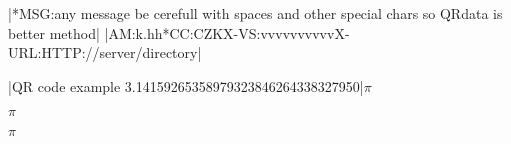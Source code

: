 {{\def\QRPamt{*AM:k.hh*CC:CZK}%
\QRdata|*MSG:any message be cerefull with spaces and other special chars so QRdata is better method|\!\def\!\QRPmsg\!{\QRcontent}%
\def\QRPvs{*X-VS:vvvvvvvvvv}%
\def\QRPurl{*X-URL:HTTP://server/directory}%
\def\QRPay{\edef\QRPcontent{|\QRPstart\QRPacc\QRPamt\QRPdspl\QRPmsg\QRPvs\QRPss\QRPurl|}%
\!\QRdata\QRPcontent\QRcode}%
\QRPay\box\QRcodebox
\def\QRLog{\QRnumA=\QRmaxCoord\QRLogLoop}%
\def\QRLogLoop{\QRnumB=\QRmaxCoord\QRLogLoopLoop\advance\QRnumA by -1 \ifnum\QRnumA<0 \else\!\QRLogLoop\fi}%
\def\QRLogLoopLoop{\QRLogLoopLoopDo\advance\QRnumB by -1 \ifnum\QRnumB<0 \else\!\QRLogLoopLoop\fi}%
\def\QRLogLoopLoopDo{\!\show\csname QRVER\QRversion[\the\QRnumB,\the\QRnumA]\endcsname}%
\QRversion\box\QRcodebox\par\vfil\eject
{}%
\def\showdo#1{\show#1#1}%
\QRdata|QR code example 3.14159265358979323846264338327950|\QRcode $\pi$\QRversion \box\QRcodebox\par 
\freeVersion\QRcode  $\pi$\QRversion \box\QRcodebox\par
\def\QRminVersion{7}%
\def\QRmaxVersion{9}%
\QRcode  $\pi$\QRversion \box\QRcodebox\par
\def\QRmaxVersion{40}%

}}
